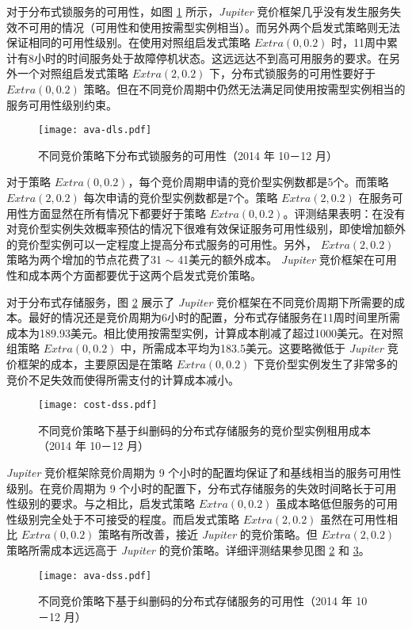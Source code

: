 对于分布式锁服务的可用性，如图 \ref{figure:dlsavailability} 所示，\emph{Jupiter} 竞价框架几乎没有发生服务失效不可用的情况（可用性和使用按需型实例相当）。而另外两个启发式策略则无法保证相同的可用性级别。在使用对照组启发式策略 $Extra(0, 0.2)$ 时，11周中累计有8小时的时间服务处于故障停机状态。这远远达不到高可用服务的要求。在另外一个对照组启发式策略 $Extra(2, 0.2)$ 下，分布式锁服务的可用性要好于 $Extra(0, 0.2)$ 策略。但在不同竞价周期中仍然无法满足同使用按需型实例相当的服务可用性级别约束。
\begin{figure}
  \centering
  \texttt{[image: ava-dls.pdf]}
  \caption{不同竞价策略下分布式锁服务的可用性（2014 年 10－12 月）}
  \label{figure:dlsavailability}
\end{figure}

对于策略 $Extra(0, 0.2)$，每个竞价周期申请的竞价型实例数都是5个。而策略 $Extra(2, 0.2)$ 每次申请的竞价型实例数都是7个。策略 $Extra(2, 0.2)$ 在服务可用性方面显然在所有情况下都要好于策略 $Extra(0, 0.2)$。评测结果表明：在没有对竞价型实例失效概率预估的情况下很难有效保证服务可用性级别，即使增加额外的竞价型实例可以一定程度上提高分布式服务的可用性。另外， $Extra(2, 0.2)$ 策略为两个增加的节点花费了31 $\sim$ 41美元的额外成本。 \emph{Jupiter} 竞价框架在可用性和成本两个方面都要优于这两个启发式竞价策略。

对于分布式存储服务，图 \ref{figure:dsscost} 展示了  \emph{Jupiter}  竞价框架在不同竞价周期下所需要的成本。最好的情况还是竞价周期为6小时的配置，分布式存储服务在11周时间里所需成本为189.93美元。相比使用按需型实例，计算成本削减了超过1000美元。在对照组策略 $Extra(0, 0.2)$ 中，所需成本平均为183.5美元。这要略微低于  \emph{Jupiter}  竞价框架的成本，主要原因是在策略 $Extra(0, 0.2)$ 下竞价型实例发生了非常多的竞价不足失效而使得所需支付的计算成本减小。
\begin{figure}
  \centering
  \texttt{[image: cost-dss.pdf]}
  \caption{不同竞价策略下基于纠删码的分布式存储服务的竞价型实例租用成本（2014 年 10－12 月）}
  \label{figure:dsscost}
\end{figure}

\emph{Jupiter} 竞价框架除竞价周期为 9 个小时的配置均保证了和基线相当的服务可用性级别。在竞价周期为 9 个小时的配置下，分布式存储服务的失效时间略长于可用性级别的要求。与之相比，启发式策略 $Extra(0, 0.2)$ 虽成本略低但服务的可用性级别完全处于不可接受的程度。而启发式策略 $Extra(2, 0.2)$ 虽然在可用性相比 $Extra(0, 0.2)$ 策略有所改善，接近 \emph{Jupiter}  的竞价策略。但 $Extra(2, 0.2)$ 策略所需成本远远高于 \emph{Jupiter} 的竞价策略。详细评测结果参见图 \ref{figure:dsscost} 和 \ref{figure:dssavailability}。
\begin{figure}
  \centering
  \texttt{[image: ava-dss.pdf]}
  \caption{不同竞价策略下基于纠删码的分布式存储服务的可用性（2014 年 10－12 月）}
  \label{figure:dssavailability}
\end{figure}

